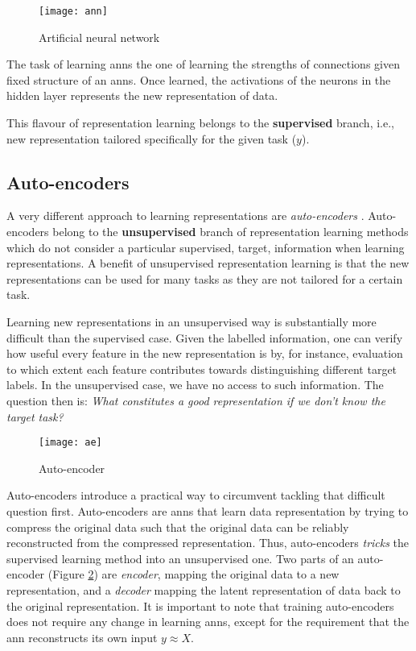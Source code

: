 \begin{figure}
	\centering
	\texttt{[image: ann]}
	\caption{Artificial neural network}
	\label{fig:ann}
\end{figure}


The task of learning \gls{ann}s the one of learning the strengths of connections given fixed structure of an \gls{ann}s.
Once learned, the activations of the neurons in the hidden layer represents the new representation of data.


This flavour of representation learning belongs to the \textbf{supervised} branch, i.e.,  new representation tailored specifically for the given task ($y$).




\subsection{Auto-encoders}


A very different approach to learning representations are \textit{auto-encoders} \cite{Hinton504}.
Auto-encoders belong to the \textbf{unsupervised} branch of representation learning methods which do not consider a particular supervised, target, information when learning representations.
A benefit of unsupervised representation learning is that the new representations can be used for many tasks as they are not tailored for a certain task.


Learning new representations in an unsupervised way is substantially more difficult than the supervised case.
Given the labelled information, one can verify how useful every feature in the new representation is  by, for instance, evaluation to which extent each feature contributes towards distinguishing different target labels.
In the unsupervised case, we have no access to such information.
The question then is: \textit{What constitutes a good representation if we don't know the target task?}


\begin{figure}
	\centering
	\texttt{[image: ae]}
	\caption{Auto-encoder}
	\label{fig:ae}
\end{figure}



Auto-encoders introduce a practical way to circumvent tackling that difficult question first.
Auto-encoders are \gls{ann}s that learn data representation by trying to compress the original data such that the original data can be reliably reconstructed from the compressed representation.
Thus, auto-encoders \textit{tricks} the supervised learning method into an unsupervised one.
Two parts of an auto-encoder (Figure \ref{fig:ae}) are \textit{encoder}, mapping the original data to a new representation, and a \textit{decoder} mapping the latent representation of data back to the original representation.
It is important to note that training auto-encoders does not require any change in learning \gls{ann}s, except for the requirement that the \gls{ann} reconstructs its own input $y \approx X$.




